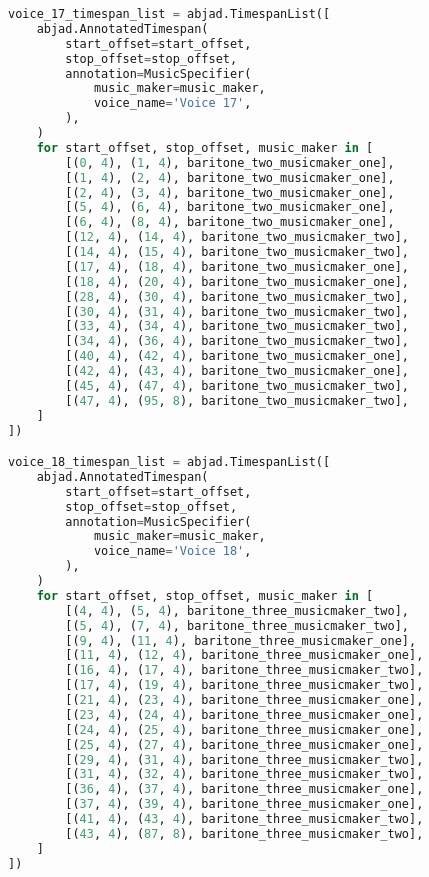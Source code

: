 \begin{lstlisting}[language=Python, caption=Invocation Source Code]
voice_17_timespan_list = abjad.TimespanList([
    abjad.AnnotatedTimespan(
        start_offset=start_offset,
        stop_offset=stop_offset,
        annotation=MusicSpecifier(
            music_maker=music_maker,
            voice_name='Voice 17',
        ),
    )
    for start_offset, stop_offset, music_maker in [
        [(0, 4), (1, 4), baritone_two_musicmaker_one],
        [(1, 4), (2, 4), baritone_two_musicmaker_one],
        [(2, 4), (3, 4), baritone_two_musicmaker_one],
        [(5, 4), (6, 4), baritone_two_musicmaker_one],
        [(6, 4), (8, 4), baritone_two_musicmaker_one],
        [(12, 4), (14, 4), baritone_two_musicmaker_two],
        [(14, 4), (15, 4), baritone_two_musicmaker_two],
        [(17, 4), (18, 4), baritone_two_musicmaker_one],
        [(18, 4), (20, 4), baritone_two_musicmaker_one],
        [(28, 4), (30, 4), baritone_two_musicmaker_two],
        [(30, 4), (31, 4), baritone_two_musicmaker_two],
        [(33, 4), (34, 4), baritone_two_musicmaker_two],
        [(34, 4), (36, 4), baritone_two_musicmaker_two],
        [(40, 4), (42, 4), baritone_two_musicmaker_one],
        [(42, 4), (43, 4), baritone_two_musicmaker_one],
        [(45, 4), (47, 4), baritone_two_musicmaker_two],
        [(47, 4), (95, 8), baritone_two_musicmaker_two],
    ]
])

voice_18_timespan_list = abjad.TimespanList([
    abjad.AnnotatedTimespan(
        start_offset=start_offset,
        stop_offset=stop_offset,
        annotation=MusicSpecifier(
            music_maker=music_maker,
            voice_name='Voice 18',
        ),
    )
    for start_offset, stop_offset, music_maker in [
        [(4, 4), (5, 4), baritone_three_musicmaker_two],
        [(5, 4), (7, 4), baritone_three_musicmaker_two],
        [(9, 4), (11, 4), baritone_three_musicmaker_one],
        [(11, 4), (12, 4), baritone_three_musicmaker_one],
        [(16, 4), (17, 4), baritone_three_musicmaker_two],
        [(17, 4), (19, 4), baritone_three_musicmaker_two],
        [(21, 4), (23, 4), baritone_three_musicmaker_one],
        [(23, 4), (24, 4), baritone_three_musicmaker_one],
        [(24, 4), (25, 4), baritone_three_musicmaker_one],
        [(25, 4), (27, 4), baritone_three_musicmaker_one],
        [(29, 4), (31, 4), baritone_three_musicmaker_two],
        [(31, 4), (32, 4), baritone_three_musicmaker_two],
        [(36, 4), (37, 4), baritone_three_musicmaker_one],
        [(37, 4), (39, 4), baritone_three_musicmaker_one],
        [(41, 4), (43, 4), baritone_three_musicmaker_two],
        [(43, 4), (87, 8), baritone_three_musicmaker_two],
    ]
])


\end{lstlisting}
